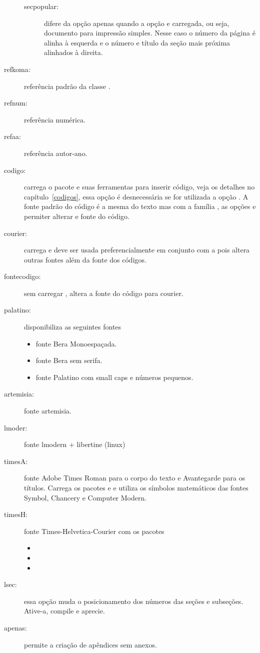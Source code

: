 \begin{description}
\begin{description}
      \item[secpopular:] difere da opção  apenas quando a opção  e carregada, ou seja, documento para impressão simples. Nesse caso o número da página é alinha à esquerda e o número e título da seção mais próxima alinhados à direita.
    \end{description}
\item[refkoma\opp{(padrão)}:] referência padrão da classe .
\item[refnum:] referência numérica.
\item[refaa:] referência autor-ano.
\item[codigo:] carrega o pacote  e suas ferramentas para 
inserir código, veja os detalhes no capítulo~\ref{codigos}, essa opção é 
desnecessária se for utilizada a opção . A fonte padrão do código é 
a mesma do texto mas com a família , as opções  e 
 permiter alterar e fonte do código.
\item[courier:] carrega  e deve ser usada preferencialmente em 
conjunto com a  pois altera outras fontes além da fonte dos códigos. 
\item[fontecodigo:] sem carregar , altera a fonte do código para 
courier.
\item[palatino:] disponibiliza as seguintes fontes
\begin{itemize}
	\item {} fonte Bera Monoespaçada.
	\item {} fonte Bera sem serifa.
	\item {} fonte Palatino com small caps e números pequenos.
\end{itemize}
\item[artemisia:]  fonte artemisia.
\item[lmoder:]  fonte lmodern + libertine (linux)
\item[timesA:] fonte Adobe Times Roman para o corpo do texto e Avantegarde para 
os títulos. Carrega os pacotes  e  e utiliza  os 
símbolos matemáticos das fontes Symbol, Chancery e Computer Modern.
\item[timesH:] fonte Times-Helvetica-Courier com os pacotes
\begin{itemize}
	\item {}
	\item {}
	\item {}
\end{itemize}
\item[lsec:] essa opção muda o posicionamento dos números das seções e 
subseções. Ative-a, compile e aprecie.
\item[apenas:] permite a criação de apêndices sem anexos.


\end{description}
